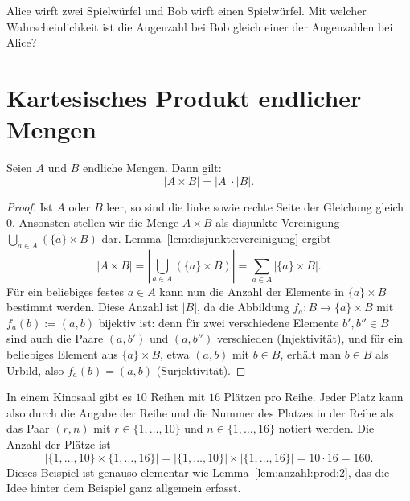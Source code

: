 \begin{aufg}
	Alice wirft zwei Spielwürfel und Bob wirft einen Spielwürfel. Mit welcher Wahrscheinlichkeit ist die Augenzahl bei Bob gleich einer der Augenzahlen bei Alice? 
\end{aufg} 


\section{Kartesisches Produkt endlicher Mengen} 

\begin{lem} \label{lem:anzahl:prod:2}
	Seien $A$ und $B$ endliche Mengen. Dann gilt: 
	\[
		|A \times B| = |A| \cdot |B|. 
	\]
\end{lem}
\begin{proof} 
	Ist $A$ oder $B$ leer, so sind die linke sowie rechte Seite der Gleichung gleich $0$. Ansonsten stellen wir die Menge $A \times B$ als disjunkte Vereinigung $\bigcup\limits_{a \in A} \left(\{a\} \times B\right)$ dar. Lemma~\ref{lem:disjunkte:vereinigung} ergibt
	\[
		|A \times B| = \left| \bigcup_{a \in A} \left(\{a \} \times B\right) \right| = \sum_{a \in A} | \{a \} \times B |.
	\]
	Für ein beliebiges festes $a \in A$ kann nun die Anzahl der Elemente in $\{a\} \times B$ bestimmt werden. Diese Anzahl ist $|B|$, da die Abbildung $f_a : B \to \{a\} \times B$ mit $f_a(b) := (a,b)$ bijektiv ist: denn für zwei verschiedene Elemente $b',b'' \in B$ sind auch die Paare $(a,b')$ und $(a,b'')$ verschieden (Injektivität), und für ein beliebiges Element aus $\{a\} \times B$, etwa $(a,b)$ mit $b \in B$, erhält man $b \in B$ als Urbild, also $f_a(b) = (a,b)$ (Surjektivität). 
\end{proof} 

\begin{bsp}
	In einem Kinosaal gibt es $10$ Reihen mit $16$ Plätzen pro Reihe. Jeder Platz kann also durch die Angabe der Reihe und die Nummer des Platzes in der Reihe als das Paar $(r,n)$ mit $r \in \{1,\ldots,10\}$ und $n \in \{1,\ldots,16\}$ notiert werden. Die Anzahl der Plätze ist 
	\[
			| \{1,\ldots,10\} \times \{1,\ldots,16\} |  = | \{1,\ldots,10\} | \times | \{1,\ldots,16\}| = 10 \cdot 16 = 160. 
	\]
	Dieses Beispiel ist genauso elementar wie Lemma~\ref{lem:anzahl:prod:2}, das die Idee hinter dem Beispiel ganz allgemein erfasst. 
\end{bsp} 
 

